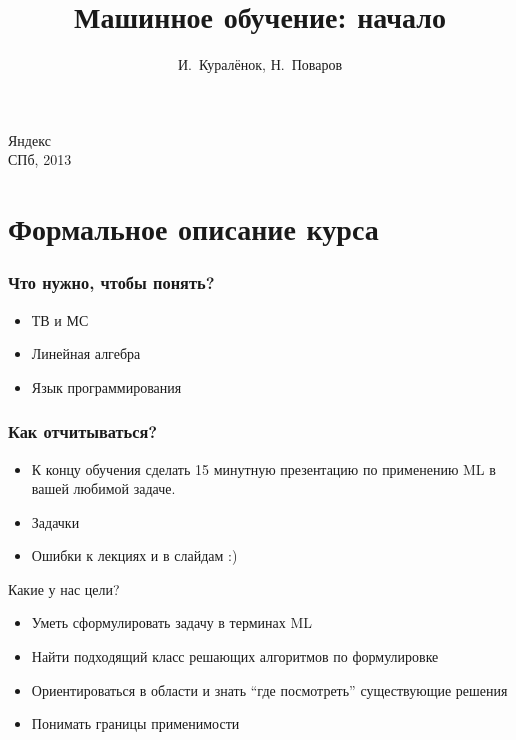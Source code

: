 \documentclass[14pt, fleqn, xcolor={dvipsnames, table}]{beamer}
\title{Машинное обучение: начало\\\small{}}
\author[]{\small{%
И.~Куралёнок,
Н.~Поваров}}
\date{}
\begin{document}
\begin{frame}
\maketitle
\small
\begin{center}
\vspace{-60pt}
\normalsize {\color{red}Я}ндекс \\
\vspace{80pt}
\footnotesize СПб, 2013
\end{center}
\end{frame}

\section{Формальное описание курса}

\begin{frame}
\frametitle{Что нужно, чтобы понять?}
\begin{itemize}
	\item ТВ и МС
	\item Линейная алгебра
	\item Язык программирования
\end{itemize}
\end{frame}

\begin{frame}
\frametitle{Как отчитываться?}
\begin{itemize}
\item К концу обучения сделать 15 минутную презентацию по применению ML в вашей любимой задаче.
\item Задачки
\item Ошибки к лекциях и в слайдам :)
\end{itemize}
\end{frame}

\begin{frame}{Какие у нас цели?}
\begin{itemize}
	\item Уметь сформулировать задачу в терминах ML
	\item Найти подходящий класс решающих алгоритмов по формулировке
	\item Ориентироваться в области и знать ``где посмотреть'' существующие решения
	\item Понимать границы применимости
\end{itemize}
\end{frame}
\end{document}
